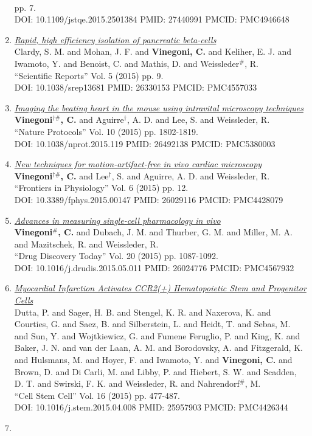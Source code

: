\documentclass{resume}
\begin{document}
\begin{category}{~~}
\begin{enumerate}
pp. 7. \\ DOI: 10.1109/jstqe.2015.2501384 PMID: 27440991 PMCID: PMC4946648\item \href{https://cvinegoni.github.io/assets/pdf/papers/2015-SREP.pdf}{\it  Rapid, high efficiency isolation of pancreatic beta-cells} \\ Clardy, S. M. and Mohan, J. F. and {\bf Vinegoni, C.} and Keliher, E. J. and Iwamoto, Y. and Benoist, C. and Mathis, D. and Weissleder$^\#$, R. \\ ``Scientific Reports'' Vol. 5 (2015) pp. 9. \\ DOI: 10.1038/srep13681 PMID: 26330153 PMCID: PMC4557033\item \href{https://cvinegoni.github.io/assets/pdf/papers/2015-NPROT.pdf}{\it  Imaging the beating heart in the mouse using intravital microscopy techniques} \\ {\bf Vinegoni$^{\dag \#}$, C.} and Aguirre$^\dag$, A. D. and Lee, S. and Weissleder, R. \\ ``Nature Protocols'' Vol. 10 (2015) pp. 1802-1819. \\ DOI: 10.1038/nprot.2015.119 PMID: 26492138 PMCID: PMC5380003\item \href{https://cvinegoni.github.io/assets/pdf/papers/2015-FPHYS.pdf}{\it  New techniques for motion-artifact-free in vivo cardiac microscopy} \\ {\bf Vinegoni$^{\dag \#}$, C.} and Lee$^\dag$, S. and Aguirre, A. D. and Weissleder, R. \\ ``Frontiers in Physiology'' Vol. 6 (2015) pp. 12. \\ DOI: 10.3389/fphys.2015.00147 PMID: 26029116 PMCID: PMC4428079\item \href{https://cvinegoni.github.io/assets/pdf/papers/2015-DDT.pdf}{\it  Advances in measuring single-cell pharmacology in vivo} \\ {\bf Vinegoni$^\#$, C.} and Dubach, J. M. and Thurber, G. M. and Miller, M. A. and Mazitschek, R. and Weissleder, R. \\ ``Drug Discovery Today'' Vol. 20 (2015) pp. 1087-1092. \\ DOI: 10.1016/j.drudis.2015.05.011 PMID: 26024776 PMCID: PMC4567932\item \href{https://cvinegoni.github.io/assets/pdf/papers/2015-CSC.pdf}{\it  Myocardial Infarction Activates CCR2(+) Hematopoietic Stem and Progenitor Cells} \\ Dutta, P. and Sager, H. B. and Stengel, K. R. and Naxerova, K. and Courties, G. and Saez, B. and Silberstein, L. and Heidt, T. and Sebas, M. and Sun, Y. and Wojtkiewicz, G. and Fumene Feruglio, P. and King, K. and Baker, J. N. and van der Laan, A. M. and Borodovsky, A. and Fitzgerald, K. and Hulsmans, M. and Hoyer, F. and Iwamoto, Y. and {\bf Vinegoni, C.} and Brown, D. and Di Carli, M. and Libby, P. and Hiebert, S. W. and Scadden, D. T. and Swirski, F. K. and Weissleder, R. and Nahrendorf$^\#$, M. \\ ``Cell Stem Cell'' Vol. 16 (2015) pp. 477-487. \\ DOI: 10.1016/j.stem.2015.04.008 PMID: 25957903 PMCID: PMC4426344\item 
\end{enumerate}
\end{category}
\end{document}
